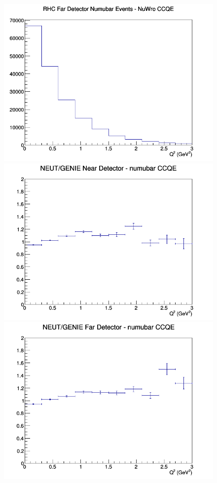 \documentclass[12pt]{article}
\begin{document}
\begin{figure}[h]
\endminipage
{}
\includegraphics[width=\linewidth]{Q2/nominal/CCQE_RHC_FD_numubar_Q2_NuWro.png}
\endminipage
\newline
{}
\includegraphics[width=\linewidth]{Q2/nominal/ratios/CCQE_NEUT_GENIE_numubar_near_Q2.png}
\endminipage
{}
\includegraphics[width=\linewidth]{Q2/nominal/ratios/CCQE_NEUT_GENIE_numubar_far_Q2.png}

\end{figure}
\end{document}

